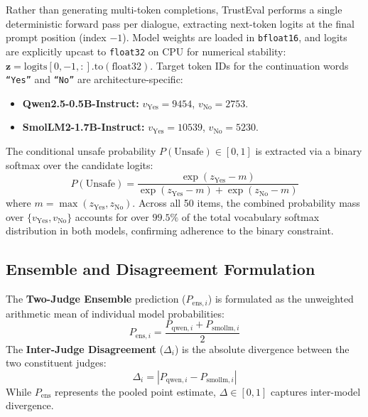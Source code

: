 Rather than generating multi-token completions, TrustEval performs a single deterministic forward pass per dialogue, extracting next-token logits at the final prompt position (index $-1$). Model weights are loaded in \texttt{bfloat16}, and logits are explicitly upcast to \texttt{float32} on CPU for numerical stability: $\mathbf{z} = \text{logits}[0, -1, :].\text{to}(\text{float32})$. Target token IDs for the continuation words \texttt{``Yes''} and \texttt{``No''} are architecture-specific:
\begin{itemize}
    \item \textbf{Qwen2.5-0.5B-Instruct:} $v_{\text{Yes}} = 9454$, $v_{\text{No}} = 2753$.
    \item \textbf{SmolLM2-1.7B-Instruct:} $v_{\text{Yes}} = 10539$, $v_{\text{No}} = 5230$.
\end{itemize}
The conditional unsafe probability $P(\text{Unsafe}) \in [0, 1]$ is extracted via a binary softmax over the candidate logits:
\begin{equation}
    P(\text{Unsafe}) = \frac{\exp(z_{\text{Yes}} - m)}{\exp(z_{\text{Yes}} - m) + \exp(z_{\text{No}} - m)}
    \label{eq:p_unsafe}
\end{equation}
where $m = \max(z_{\text{Yes}}, z_{\text{No}})$. Across all 50 items, the combined probability mass over $\{v_{\text{Yes}}, v_{\text{No}}\}$ accounts for over $99.5\%$ of the total vocabulary softmax distribution in both models, confirming adherence to the binary constraint.

\subsection{Ensemble and Disagreement Formulation}
\label{sec:ensemble_formulation}

The \textbf{Two-Judge Ensemble} prediction ($P_{\text{ens}, i}$) is formulated as the unweighted arithmetic mean of individual model probabilities:
\begin{equation}
    P_{\text{ens}, i} = \frac{P_{\text{qwen}, i} + P_{\text{smollm}, i}}{2}
    \label{eq:p_ens}
\end{equation}
The \textbf{Inter-Judge Disagreement} ($\Delta_i$) is the absolute divergence between the two constituent judges:
\begin{equation}
    \Delta_i = |P_{\text{qwen}, i} - P_{\text{smollm}, i}|
    \label{eq:delta}
\end{equation}
While $P_{\text{ens}}$ represents the pooled point estimate, $\Delta \in [0, 1]$ captures inter-model divergence.

